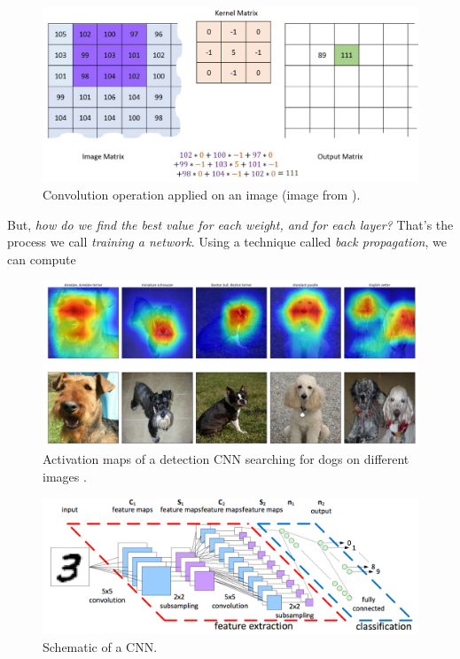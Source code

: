 \begin{figure}[h]
	\centering
	\includegraphics[width=5in]{images/convolution}
	\caption{Convolution operation applied on an image (image from \cite{image-convolution}).}
	\label{fig:1_convolution}
\end{figure}





But, \emph{how do we find the best value for each weight, and for each layer?} That's the process we call \textit{training a network}. Using a technique called \emph{back propagation}, we can compute 

\begin{figure}[h]
	\centering
	\includegraphics[width=0.9\linewidth]{images/activation_maps}
	\caption{Activation maps of a detection CNN searching for dogs on different images \cite{activation-maps}.}
	\label{fig:1_activation_maps}
\end{figure}



\begin{figure}[h]
	\centering
	\includegraphics[width=0.9\linewidth]{images/cnn}
	\caption{Schematic of a CNN.}
	\label{fig:1_cnn}
\end{figure}

